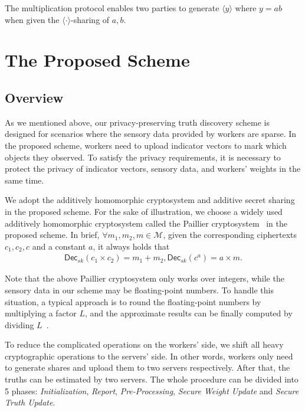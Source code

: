 \documentclass[conference]{IEEEtran}
\begin{document}
The multiplication protocol enables two parties to generate $\langle y \rangle$ where $y = ab$ when given the $\langle \cdot \rangle$-sharing of $a,b$.
\fi

\section{The Proposed Scheme}\label{sec5}
\subsection{Overview}
As we mentioned above, our privacy-preserving truth discovery scheme is designed for scenarios where the sensory data provided by workers are sparse.
In the proposed scheme, workers need to upload indicator vectors to mark which objects they observed.
To satisfy the privacy requirements, it is necessary to protect the privacy of indicator vectors, sensory data, and workers' weights in the same time.

We adopt the additively homomorphic cryptosystem and additive secret sharing in the proposed scheme.
For the sake of illustration, we choose a widely used additively homomorphic cryptosystem called the Paillier cryptosystem~\cite{paillier_public-key_1999} in the proposed scheme.
In brief, $\forall m_1, m_2, m\in\mathcal{M}$, given the corresponding ciphertexts $c_1,c_2,c$ and a constant $a$, it always holds that 
\begin{equation*}
  \begin{split}
  \mathsf{Dec}_{sk}(c_1 \times c_2) = m_1 + m_2, \mathsf{Dec}_{sk}(c ^ a ) = a\times m.
  \end{split}
\end{equation*}

Note that the above Paillier cryptosystem only works over integers, while the sensory data in our scheme may be floating-point numbers.
To handle this situation, a typical approach is to round the floating-point numbers by multiplying a factor $L$, and the approximate results can be finally computed by dividing $L$~\cite{zheng_learning_2018,miao_lightweight_2017,xue_inpptd_2020}.

To reduce the complicated operations on the workers' side, we shift all heavy cryptographic operations to the servers' side.
In other words, workers only need to generate shares and upload them to two servers respectively.
After that, the truths can be estimated by two servers.
The whole procedure can be divided into 5 phases: {\em Initialization}, {\em Report}, {\em Pre-Processing}, {\em Secure Weight Update} and {\em Secure Truth Update}.
\end{document}
